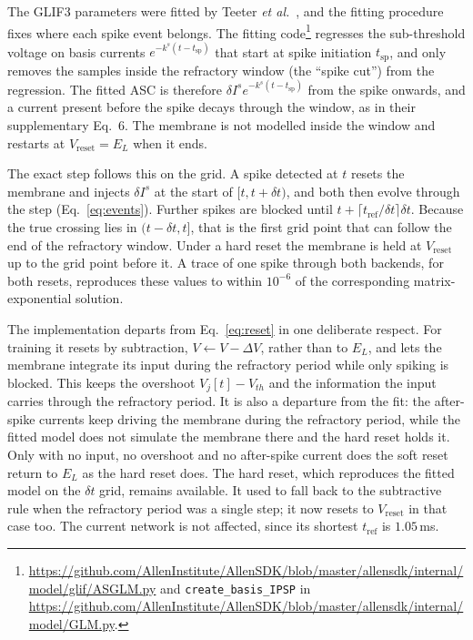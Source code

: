 \documentclass[11pt,a4paper,numbers=noenddot]{scrartcl}
\newcommand{\dt}{\delta t}
\newcommand{\code}[1]{\texttt{\small #1}}
\begin{document}
The GLIF3 parameters were fitted by Teeter
\emph{et al.}~\cite{teeter2018generalized}, and the fitting procedure fixes
where each spike event belongs. The fitting code\footnote{%
\url{https://github.com/AllenInstitute/AllenSDK/blob/master/allensdk/internal/model/glif/ASGLM.py}
and \code{create\_basis\_IPSP} in
\url{https://github.com/AllenInstitute/AllenSDK/blob/master/allensdk/internal/model/GLM.py}.}
regresses the sub-threshold voltage on basis currents
$e^{-k^{s}(t-t_{\mathrm{sp}})}$ that start at spike initiation $t_{\mathrm{sp}}$,
and only removes the samples inside the refractory window (the ``spike
cut'') from the regression. The fitted ASC is therefore
$\delta I^{s} e^{-k^{s}(t-t_{\mathrm{sp}})}$ from the spike onwards, and a current
present before the spike decays through the window, as in their
supplementary Eq.~6. The membrane is not modelled inside the window and
restarts at $V_{\mathrm{reset}} = E_L$ when it ends.

The exact step follows this on the grid. A spike detected at $t$ resets the
membrane and injects $\delta I^{s}$ at the start of $[t, t+\dt)$, and both
then evolve through the step (Eq.~\eqref{eq:events}). Further spikes are
blocked until $t + \lceil t_{\mathrm{ref}}/\dt\rceil\dt$. Because the true
crossing lies in $(t-\dt, t]$, that is the first grid point that can follow
the end of the refractory window. Under a hard reset the membrane is held at
$V_{\mathrm{reset}}$ up to the grid point before it. A trace of one spike through
both backends, for both resets, reproduces these values to within
$10^{-6}$ of the corresponding matrix-exponential solution.

The implementation departs from Eq.~\eqref{eq:reset} in one deliberate
respect. For training it resets by subtraction, $V \leftarrow V - \Delta V$,
rather than to $E_L$, and lets the membrane integrate its input during the
refractory period while only spiking is blocked. This keeps the overshoot
$V_j[t]-V_{th}$ and the information the input carries through the
refractory period. It is also a departure from the fit: the after-spike
currents keep driving the membrane during the refractory period, while the
fitted model does not simulate the membrane there and the hard reset holds
it. Only with no input, no overshoot and no after-spike current does the
soft reset return to $E_L$ as the hard reset does. The hard reset, which
reproduces the fitted model on the $\dt$ grid, remains available. It used to fall back to the subtractive rule when the
refractory period was a single step; it now resets to $V_{\mathrm{reset}}$ in that
case too. The current network is not affected, since its shortest
$t_{\mathrm{ref}}$ is $1.05\,$ms.
\end{document}
